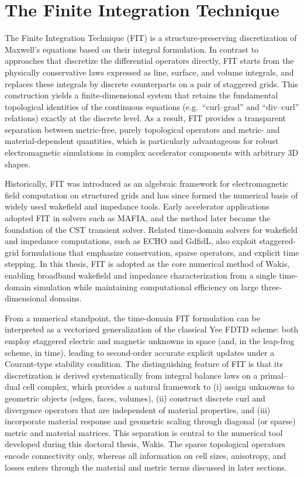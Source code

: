 \section{The Finite Integration Technique}
\label{sec:fit}

The Finite Integration Technique (FIT) is a structure-preserving discretization of Maxwell's equations based on their integral formulation. In contrast to approaches that discretize the differential operators directly, FIT starts from the physically conservative laws expressed as line, surface, and volume integrals, and replaces these integrals by discrete counterparts on a pair of staggered grids. This construction yields a finite-dimensional system that retains the fundamental topological identities of the continuous equations (e.g.\ ``curl--grad'' and ``div--curl'' relations) exactly at the discrete level. As a result, FIT provides a transparent separation between metric-free, purely topological operators and metric- and material-dependent quantities, which is particularly advantageous for robust electromagnetic simulations in complex accelerator components with arbitrary 3D shapes.

Historically, FIT was introduced as an algebraic framework for electromagnetic field computation on structured grids and has since formed the numerical basis of widely used wakefield and impedance tools. Early accelerator applications adopted FIT in solvers such as MAFIA, and the method later became the foundation of the CST transient solver. Related time-domain solvers for wakefield and impedance computations, such as ECHO and GdfidL, also exploit staggered-grid formulations that emphasize conservation, sparse operators, and explicit time stepping. In this thesis, FIT is adopted as the core numerical method of Wakis, enabling broadband wakefield and impedance characterization from a single time-domain simulation while maintaining computational efficiency on large three-dimensional domains.

From a numerical standpoint, the time-domain FIT formulation can be interpreted as a vectorized generalization of the classical Yee FDTD scheme: both employ staggered electric and magnetic unknowns in space (and, in the leap-frog scheme, in time), leading to second-order accurate explicit updates under a Courant-type stability condition. The distinguishing feature of FIT is that its discretization is derived systematically from integral balance laws on a primal--dual cell complex, which provides a natural framework to (i) assign unknowns to geometric objects (edges, faces, volumes), (ii) construct discrete curl and divergence operators that are independent of material properties, and (iii) incorporate material response and geometric scaling through diagonal (or sparse) metric and material matrices. This separation is central to the numerical tool developed during this doctoral thesis, Wakis. The sparse topological operators encode connectivity only, whereas all information on cell sizes, anisotropy, and losses enters through the material and metric terms discussed in later sections.

